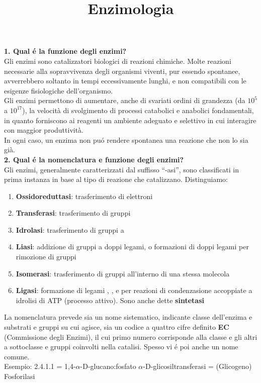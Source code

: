 \documentclass[a4paper,12pt]{article}
\date{}
\title{Enzimologia}
\begin{document}
\maketitle

\textbf{1. Qual \'e la funzione degli enzimi?}\\

Gli enzimi sono catalizzatori biologici di reazioni chimiche.
Molte reazioni necessarie alla sopravvivenza degli organismi viventi, pur essendo spontanee, avverrebbero soltanto in tempi eccessivamente lunghi, e non compatibili con le esigenze fisiologiche dell'organismo.\\
Gli enzimi permettono di aumentare, anche di svariati ordini di grandezza (da $10^5$ a $10^{17}$), la velocit\`a di svolgimento di processi catabolici e anabolici fondamentali, in quanto forniscono ai reagenti un ambiente adeguato e selettivo in cui interagire con maggior produttivit\`a.\\
In ogni caso, un enzima non pu\'o rendere spontanea una reazione che non lo sia gi\`a.\\

\textbf{2. Qual \'e la nomenclatura e funzione degli enzimi?}\\

Gli enzimi, generalmente caratterizzati dal suffisso ``-asi'', sono classificati in prima instanza in base al tipo di reazione che catalizzano. Distinguiamo:
\begin{enumerate}
\item \textbf{Ossidoreduttasi}: trasferimento di elettroni
\item \textbf{Transferasi}: trasferimento di gruppi
\item \textbf{Idrolasi}: trasferimento di gruppi a 
\item \textbf{Liasi}: addizione di gruppi a doppi legami, o formazioni di doppi legami per rimozione di gruppi
\item \textbf{Isomerasi}: trasferimento di gruppi all'interno di una stessa molecola
\item \textbf{Ligasi}: formazione di legami , ,  e  per reazioni di condenzasione accoppiate a idrolisi di ATP (processo attivo). Sono anche dette \textbf{sintetasi}
\end{enumerate}
La nomenclatura prevede sia un nome sistematico, indicante classe dell'enzima e substrati e gruppi su cui agisce, sia un codice a quattro cifre definito \textbf{EC} (Commissione degli Enzimi), il cui primo numero corrisponde alla classe e gli altri a sottoclasse e gruppi coinvolti nella catalisi. Spesso vi \'e poi anche un nome comune.\\
Esempio: 2.4.1.1 = 1,4-$\alpha$-D-glucano:fosfato $\alpha$-D-glicosiltransferasi = (Glicogeno) Fosforilasi\\
\end{document}
